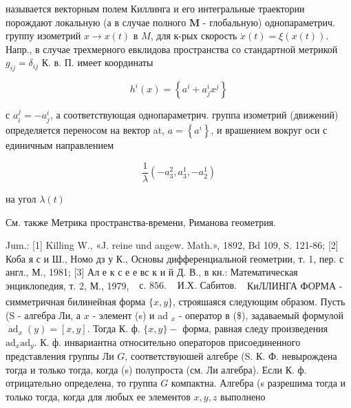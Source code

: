 \documentclass[10pt]{article}
\begin{document}
называется векторным полем Киллинга и его интегральные траектории порождают локальную (а в случае полного $\boldsymbol{M}$ - глобальную) однопараметрич. группу изометрий $x \rightarrow x(t)$ в $M$, для к-рых скорость $\dot{x}(t)=\xi(x(t))$. Напр., в случае трехмерного евклидова пространства со стандартной метрикой $g_{i j}=\delta_{i j}$ К. в. П. имеет координаты



\[

h^{i}(x)=\left\{a^{i}+a_{j}^{i} x^{j}\right\}

\]



с $a_{i}^{j}=-a_{j}^{i}$, а соответствующая однопараметрич. группа изометрий (движений) определяется переносом на вектор at, $a=\left\{a^{i}\right\}$, и врашением вокруг оси с единичным направлением



\[

\frac{1}{\lambda}\left(-a_{3}^{2}, a_{3}^{1},-a_{2}^{1}\right)

\]



на угол $\lambda(t)$



См. также Метрика пространства-времени, Риманова геометрия.



Jum.: [1] Killing W., «J. reine und angew. Math.», 1892, Bd 109, S. 121-86; [2] Коба я с и Ш., Номо дз у К., Основы дифференциальной геометрии, т. 1, пер. с англ., М., 1981; [3] Ал е к с е е вс к и й Д. В., в кн.: Математическая энциклопедия, т. 2, М., 1979, $\begin{array}{ll}\text { с. } 856 . & \text { И.Х. Сабитов. } \\ & \end{array}$ КиЛЛИНГА ФОРМА - симметричная билинейная форма $\{x, y\}$, строяшаяся следующим образом. Пусть (S - алгебра Ли, а $x$ - элемент (s) и ad ${ }_{x}$ - оператор в (\$), задаваемый формулой $\operatorname{ad}_{x}(y)=[x, y]$. Тогда К. ф. $\{x, y\}-$ форма, равная следу произведения $\mathrm{ad}_{x} \mathrm{ad}_{y}$. К. ф. инвариантна относительно операторов присоединенного представления группы Ли $G$, соответствуюшей алгебре (S. К. Ф. невырождена тогда и только тогда, когда (s) полупроста (см. Ли алгебра). Если К. ф. отрицательно определена, то группа $G$ компактна. Алгебра (s разрешима тогда и только тогда, когда для любых ее элементов $x, y, z$ выполнено
\end{document}
